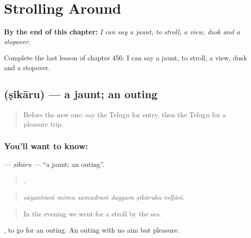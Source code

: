 
\chapter{Strolling Around}
\label{ch:te-strolling-around}

\begin{chapteropening}
\textbf{By the end of this chapter:} \emph{I can say a jaunt, to stroll, a view, dusk and a stopover.}

Complete the last lesson of chapter 456: I can say a jaunt, to stroll, a view, dusk and a stopover.
\end{chapteropening}

\section[\texorpdfstring{\te{షికారు} (ṣikāru)}{షికారు (ṣikāru)}]{ (ṣikāru) — a jaunt; an outing}

\label{lesson:TE-C456-sikaru}



\begin{quote}
Before the new one: say the Telugu for entry, then the Telugu for a pleasure trip.
\end{quote}

\subsection*{You'll want to know: }
\textbf{} — \emph{ṣikāru} — \textquotedblleft{}a jaunt; an outing\textquotedblright{}.

\begin{quote}
     .
\end{quote}

\begin{quote}
\emph{sāyantraṁ mēmu samudraṁ daggara ṣikāruku veḷḷāṁ.}
\end{quote}

\begin{quote}
In the evening we went for a stroll by the sea.
\end{quote}

 , to go for an outing. An outing with no aim but pleasure.

